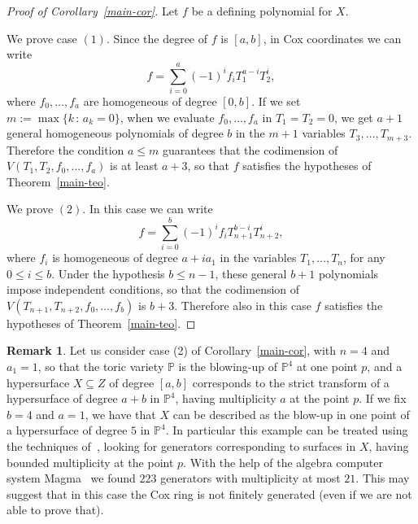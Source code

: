 \documentclass{amsart}
\theoremstyle{definition}
\newtheorem{remark}[theorem]{Remark}
\theoremstyle{remark}
\begin{document}
\begin{proof}[Proof of Corollary~\ref{main-cor}]
Let $f$ be a defining polynomial for $X$.

We prove case $(1)$.
Since the degree of $f$ is $[a,b]$, in Cox coordinates
we can write
\[
 f = \sum_{i=0}^a (-1)^if_iT_1^{a-i}T_2^i,
\]
where $f_0,\dots,f_a$ are homogeneous of degree
$[0,b]$. If we set $m := \max\{k\, :\, a_k = 0\}$,
when we evaluate $f_0,\dots,f_a$ in $T_1=T_2=0$,
we get $a+1$ general homogeneous polynomials
of degree $b$ in the $m+1$ variables
$T_3,\dots,T_{m+3}$. Therefore the
condition $a\leq m$
guarantees that the codimension of $V(T_1,T_2,f_0,
\dots,f_a)$ is at least $a+3$, so that $f$
satisfies the hypotheses of
Theorem~\ref{main-teo}.

We prove $(2)$.
In this case we can write
\[
 f = \sum_{i=0}^b(-1)^if_iT_{n+1}^{b-i}T_{n+2}^i,
\]
where $f_i$ is homogeneous of degree
$a+ia_1$ in the variables $T_1,\dots,T_n$, for
any $0\leq i\leq b$. Under the hypothesis
$b\leq n-1$, these general $b+1$ polynomials
impose independent conditions, so that
the codimension of $V(T_{n+1},T_{n+2},f_0,\dots,f_b)$
is $b+3$. Therefore also in this case $f$
satisfies the hypotheses of
Theorem~\ref{main-teo}.
\end{proof}

\begin{remark}
 \label{rem:case2}
 Let us consider case (2) of Corollary~\ref{main-cor}, with
 $n=4$ and $a_1 = 1$, so that
 the toric variety $\mathbb P$ is
 the blowing-up of $\mathbb P^4$ at one point $p$, and
 a hypersurface $X\subseteq Z$ of degree
 $[a,b]$ corresponds
 to the strict transform of a hypersurface of degree
 $a+b$ in $\mathbb P^4$, having multiplicity $a$
 at the point $p$. If we fix $b=4$ and $a=1$, we
 have that $X$ can be described as the blow-up
 in one point of a hypersurface of degree $5$ in
 $\mathbb P^4$. In particular this example can be treated using the techniques of~\cite{hlk}, looking for generators
 corresponding to surfaces in $X$, having
 bounded multiplicity at the point $p$.
 With the help of the algebra computer
 system Magma~\cite{magma} we found $223$
 generators with multiplicity at most $21$.
 This may suggest that in this case the
 Cox ring is not finitely generated (even if
 we are not able to prove that).
 \end{remark}
\end{document}
